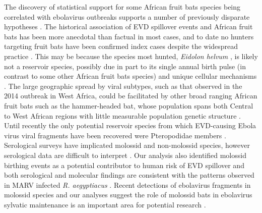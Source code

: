 \documentclass[a4paper,twoside, onecolumn]{article}
\begin{document}
	The discovery of statistical support for some African fruit bats species being correlated with ebolavirus outbreaks supports a number of previously disparate hypotheses \cite{Hayman2015, Walsh2005, Han2016}. The historical association of EVD spillover events and African fruit bats has been more anecdotal than factual in most cases, and to date no hunters targeting fruit bats have been confirmed index cases despite the widespread practice \cite{Kamins2011,Mickleburgh2009,Peel2017}. This may be because the species most hunted, \textit{Eidolon helvum} \cite{Kamins2011, Mickleburgh2009}, is likely not a reservoir species, possibly due in part to its single annual birth pulse (in contrast to some other African fruit bats species) \cite{Hayman2012, Hayman2010} and unique cellular mechanisms \cite{ng2015}. The large geographic spread by viral subtypes, such as that observed in the 2014 outbreak in West Africa, could be facilitated by other broad ranging African fruit bats such as the hammer-headed bat, whose population spans both Central to West African regions with little measurable population genetic structure \cite{Hassanin2016}. Until recently the only potential reservoir species from which EVD-causing Ebola virus viral fragments have been recovered were Pteropodidae members \cite{Leroy2005, Olival2014}. Serological surveys have implicated molossid and non-molossid species, however serological data are difficult to interpret \cite{gilbert2013}. Our analysis also identified molossid birthing events as a potential contributor to human risk of EVD spillover and both serological and molecular findings are consistent with the patterns observed in MARV infected \textit{R. aegyptiacus} \cite{Pourrut2009, Amman2012}. Recent detections of ebolavirus fragments in molossid species and our analyses suggest the role of molossid bats in ebolavirus sylvatic maintenance is an important area for potential research \cite{Kupferschmidt2019, Goldstein2018}.\par
\end{document}
